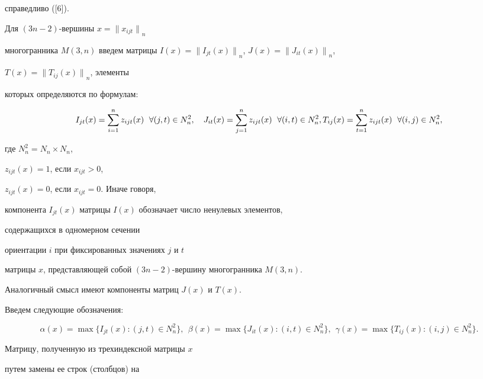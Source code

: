справедливо ([6]).





Для $(3n-2)$-вершины $x={\|x_{ijt}\|}_n$ 


многогранника $M(3,n)$ введем матрицы $I(x)=


{\|I_{jt}(x)\|}_n$, $J(x)={\|J_{it}(x)\|}_n$,


$T(x)={\|T_{ij}(x)\|}_n$, элементы


которых определяются по формулам:


$$


I_{jt}(x)=\sum\limits^n_{i=1}z_{ijt}(x)\ \; \forall (j,t)


\in N^2_n,\quad J_{it}(x)=\sum\limits^n_{j=1}z_{ijt}(x)


\ \; \forall (i,t)\in N^2_n, \\ T_{ij}


(x)=\sum\limits^n_{t=1}z_{ijt}(x)


\ \; \forall (i,j)\in N^2_n,


$$


где $N_n^2=N_n\times N_n$,


$z_{ijt}(x)=1$, если $x_{ijt}>0$,


$z_{ijt}(x)=0$, если $x_{ijt}=0$. Иначе говоря,


компонента $I_{jt}(x)$ матрицы $I(x)$ обозначает число ненулевых элементов,


содержащихся в одномерном сечении 


ориентации $i$ при фиксированных значениях $j$ и $t$ 


матрицы $x$, представляющей собой $(3n-2)$-вершину многогранника $M(3,n)$.


Аналогичный смысл имеют компоненты матриц $J(x)$ и $T(x)$.





Введем следующие обозначения:


$$


\alpha(x)=\max\{I_{jt}(x):(j,t)\in N_n^2\},\ \ \beta(x)


=\max\{J_{it}(x):(i,t)\in N_n^2\}, \ \


\gamma(x)=\max\{T_{ij}(x):(i,j)\in N_n^2\}.


$$





Матрицу, полученную из трехиндексной матрицы $x$ 


путем замены ее строк (столбцов) на


